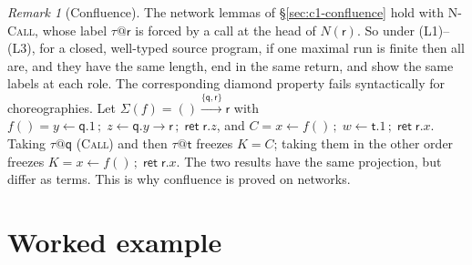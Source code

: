 \documentclass[11pt]{report}
\makeatletter
\theoremstyle{plain}
\theoremstyle{definition}
\theoremstyle{remark}
\newtheorem{remark}[theorem]{Remark}
\newcommand{\kw}[1]{\mathsf{#1}}
\newcommand{\qq}{\mathsf{q}}
\newcommand{\rr}{\mathsf{r}}
\newcommand{\tr}{\mathsf{t}}
\newcommand{\bind}[3]{#1 \leftarrow #2\,;\;#3}
\newcommand{\cret}[1]{\kw{ret}\;#1}
\newcommand{\com}[3]{#1.#2 \to #3}
\newcommand{\tauat}[1]{\tau\mathord{@}#1}
\newcommand{\Sig}{\Sigma}
\newcommand{\farr}[3]{(#1) \xrightarrow{#2} #3}
\newcommand{\rn}[1]{{\normalfont\scshape #1}}
\makeatother
\begin{document}
\begin{remark}[Confluence]\label{rem:c3-diamond}
  The network lemmas of \S\ref{sec:c1-confluence} hold with \rn{N-Call}, whose
  label $\tauat{\rr}$ is forced by a call at the head of $N(\rr)$.  So under
  (L1)--(L3), for a closed, well-typed source program, if one maximal run is
  finite then all are, and they have the same length, end in the same
  return, and show the same labels at each role.  The corresponding diamond property fails syntactically for
  choreographies.  Let $\Sig(f)=\farr{}{\{\qq,\rr\}}{\rr}$ with
  $f()=\bind{y}{\qq.1}{\bind{z}{\com{\qq}{y}{\rr}}{\cret{\rr.z}}}$, and
  $C=\bind{x}{f()}{\bind{w}{\tr.1}{\cret{\rr.x}}}$.  Taking $\tauat{\qq}$
  (\rn{Call}) and then $\tauat{\tr}$ freezes $K=C$; taking them in the other
  order freezes $K=\bind{x}{f()}{\cret{\rr.x}}$.  The two results have the
  same projection, but differ as terms.  This is why confluence is proved on
  networks.
\end{remark}

\section{Worked example}
\label{sec:c3-example}
\end{document}
